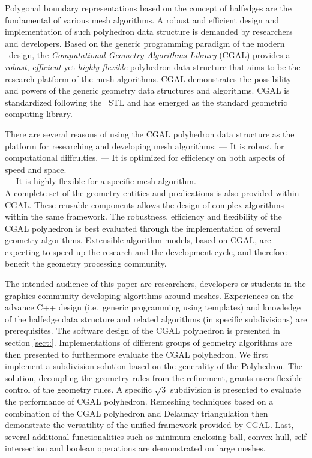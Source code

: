 Polygonal boundary representations based on the concept of
halfedges \cite{k-ugpdd-99} are the fundamental of 
various mesh algorithms. A robust and efficient
design and implementation of such polyhedron data
structure is demanded by researchers and
developers. Based on the generic programming paradigm 
of the modern \CC\ design, the \emph{Computational 
Geometry Algorithms Library} (CGAL) provides a 
\emph{robust}, \emph{efficient} yet \emph{highly flexible} 
polyhedron data structure that aims to be the research
platform of the mesh algorithms. CGAL demonstrates
the possibility and powers of the generic geometry data structures
and algorithms. CGAL is standardized following the \CC\ STL 
and has emerged as the standard geometric computing library.

There are several reasons of using the CGAL polyhedron
data structure as the platform for researching and developing
mesh algorithms:
\indent --- It is robust for computational diffculties.
\indent --- It is optimized for efficiency on both aspects of
speed and space.\\
\indent --- It is highly flexible for a specific mesh algorithm.\\
\noindent A complete set of the geometry entities and 
predications is also provided within CGAL. These reusable components 
allows the design of complex algorithms within the same framework.
The robustness, efficiency and flexibility of the CGAL polyhedron is
best evaluated through the implementation of several geometry algorithms.
Extensible algorithm models, based on CGAL, are expecting to speed up the
research and the development cycle, and therefore benefit the 
geometry processing community.

The intended audience of this paper are researchers, developers or
students in the graphics community developing algorithms around
meshes. Experiences on the advance C++ design (i.e.\ generic
programming using templates) and knowledge of the halfedge data
structure and related algorithms (in specific subdivisions) are
prerequisites. The software design of the CGAL 
polyhedron is presented in section \ref{sect:}.
Implementations of different groups of geometry algorithms 
are then presented to furthermore evaluate the CGAL polyhedron.  
We first implement a subdivision solution based on the generality of the
Polyhedron. The solution, decoupling the geometry rules from the
refinement, grants users flexible control of the geometry rules.
A specific $\sqrt{3}$ subdivision is presented to evaluate the
performance of CGAL polyhedron. Remeshing techniques based 
on a combination of the 
CGAL polyhedron and Delaunay triangulation then demonstrate 
the versatility of the unified framework provided by CGAL.  
Last, several additional functionalities
such as minimum enclosing ball, convex hull, self intersection and
boolean operations are demonstrated on large meshes.  

